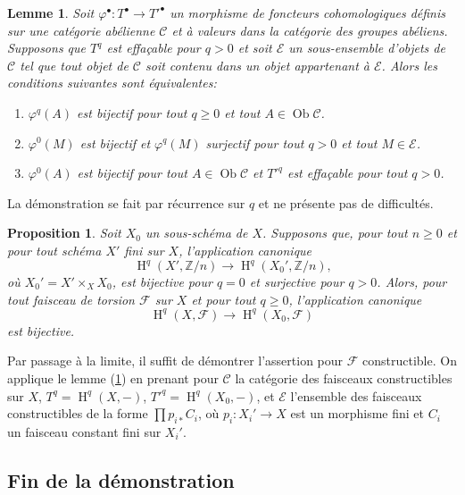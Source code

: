 \documentclass{book}
\DeclareMathOperator{\h}{H}
\DeclareMathOperator{\ob}{Ob}
\newcommand{\cF}{\mathcal{F}}
\newcommand{\dZ}{\mathbb{Z}}
\newcommand{\sC}{\mathscr{C}}
\newcommand{\sE}{\mathscr{E}}
\newtheorem{proposition}[subsubsection]{Proposition}
\newtheorem{lemma}[subsubsection]{Lemme}
\begin{document}
\begin{lemma}\label{I:4-3-6}
Soit $\varphi^\bullet:T^\bullet\to {T'}^\bullet$ un morphisme de foncteurs 
cohomologiques définis sur une catégorie abélienne $\sC$ et à valeurs 
dans la catégorie des groupes abéliens. Supposons que $T^q$ est effaçable 
pour $q>0$ et soit $\sE$ un sous-ensemble d'objets de $\sC$ tel que tout objet 
de $\sC$ soit contenu dans un objet appartenant à $\sE$. Alors les 
conditions suivantes sont équivalentes:
\begin{enumerate}[\indent (i)]
  \item $\varphi^q(A)$ est bijectif pour tout $q\geqslant 0$ et tout 
    $A\in\ob \sC$.
  \item $\varphi^0(M)$ est bijectif et $\varphi^q(M)$ surjectif pour tout 
    $q>0$ et tout $M\in\sE$. 
  \item $\varphi^0(A)$ est bijectif pour tout $A\in\ob \sC$ et ${T'}^q$ est 
    effaçable pour tout $q>0$. 
\end{enumerate}
\end{lemma}

La démonstration se fait par récurrence sur $q$ et ne présente pas de 
difficultés. 





\begin{proposition}\label{I:4-3-7}
Soit $X_0$ un sous-schéma de $X$. Supposons que, pour tout $n\geqslant 0$ et 
pour tout schéma $X'$ fini sur $X$, l'application canonique 
\[
  \h^q(X',\dZ/n) \to \h^q(X_0',\dZ/n)\text{,}
\]
où $X_0' = X'\times_X X_0$, est bijective pour $q=0$ et surjective pour 
$q>0$. Alors, pour tout faisceau de torsion $\cF$ sur $X$ et pour tout 
$q\geqslant 0$, l'application canonique 
\[
  \h^q(X,\cF) \to \h^q(X_0,\cF)
\]
est bijective.
\end{proposition}

Par passage à la limite, il suffit de démontrer l'assertion pour $\cF$ 
constructible. On applique le lemme (\ref{I:4-3-6}) en prenant pour $\sC$ la 
catégorie des faisceaux constructibles sur $X$, $T^q=\h^q(X,-)$, 
${T'}^q=\h^q(X_0,-)$, et $\sE$ l'ensemble des faisceaux constructibles de la 
forme $\prod p_{i*} C_i$, où $p_i:X_i'\to X$ est un morphisme fini et $C_i$ 
un faisceau constant fini sur $X_i'$. 










\subsection{Fin de la démonstration}\label{I:4-4}
\end{document}

